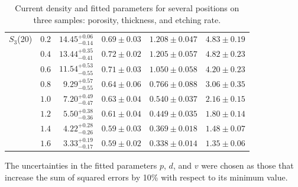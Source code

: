 \documentclass[review,sort&compress]{cas-sc}
\begin{document}
\begin{table}
\begin{tabular}{lrrrrr}
$S_3$(20) &$0.2$ &$14.45^{+0.06}_{-0.14}$&$0.69\pm0.03$ &$1.208\pm0.047$ &$  4.83\pm0.19$ \\
         &$0.4$ &$ 13.44^{+0.35}_{-0.41}$&$0.72\pm0.02$ &$1.205\pm0.057$ &$  4.82\pm0.23$ \\
         &$0.6$ &$ 11.54^{+0.53}_{-0.55}$&$0.71\pm0.03$ &$1.050\pm0.058$ &$  4.20\pm0.23$ \\
         &$0.8$ &$  9.29^{+0.57}_{-0.55}$&$0.64\pm0.06$ &$0.766\pm0.088$ &$  3.06\pm0.35$ \\
         &$1.0$ &$  7.20^{+0.49}_{-0.47}$&$0.63\pm0.04$ &$0.540\pm0.037$ &$  2.16\pm0.15$  \\
         &$1.2$ &$  5.50^{+0.38}_{-0.36}$&$0.61\pm0.04$ &$0.449\pm0.035$ &$  1.80\pm0.14$ \\
         &$1.4$ &$  4.22^{+0.28}_{-0.26}$&$0.59\pm0.03$ &$0.369\pm0.018$ &$  1.48\pm0.07$ \\
         &$1.6$ &$  3.33^{+0.19}_{-0.17}$&$0.59\pm0.02$ &$0.338\pm0.014$ &$  1.35\pm0.06$ \\
\end{tabular}
\caption{\label{t:jpdv}
  Current density and fitted parameters for several positions on
  three samples:  porosity, thickness, and etching rate.}
\end{table}
The uncertainties in the fitted parameters $p$, $d$, and $v$ were
chosen as those that increase the sum of squared errors by 10\% with
respect to its minimum value.
\end{document}
